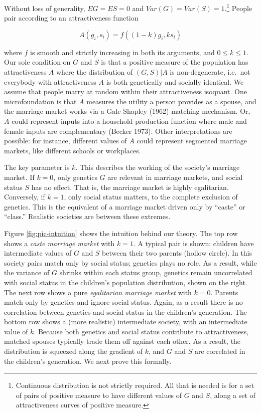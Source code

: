 \documentclass[
]{article}
\begin{document}
Without loss of generality, \(EG = ES = 0\) and \(Var(G) = Var(S) = 1\).\footnote{Continuous distribution is not strictly required. All that is
  needed is for a set of pairs of positive measure to have different
  values of \(G\) and \(S\), along a set of attractiveness curves of
  positive measure.}
People pair according to an attractiveness function

\[
A(g_{i},s_{i}) = f((1-k)g_{i},ks_{i})
\]

where \(f\) is smooth and strictly increasing in both its arguments, and
\(0 \le k \le 1\). Our sole condition on \(G\) and \(S\) is that a positive
measure of the population has attractiveness \(A\) where the distribution
of \((G, S)|A\) is non-degenerate, i.e.~not everybody with attractiveness
\(A\) is both genetically and socially identical. We assume that people
marry at random within their attractiveness isoquant. One
microfoundation is that \(A\) measures the utility a person provides as a
spouse, and the marriage market works via a Gale-Shapley
(1962) matching mechanism. Or, \(A\) could represent inputs
into a household production function where male and female inputs are
complementary (Becker 1973). Other interpretations are possible:
for instance, different values of \(A\) could represent segmented marriage
markets, like different schools or workplaces.

The key parameter is \(k\). This describes the working of the society's
marriage market. If \(k = 0\), only genetics \(G\) are relevant in marriage
markets, and social status \(S\) has no effect. That is, the marriage
market is highly egalitarian. Conversely, if \(k = 1\), only social status
matters, to the complete exclusion of genetics. This is the equivalent
of a marriage market driven only by ``caste'' or ``class.'' Realistic
societies are between these extremes.

Figure \ref{fig:pic-intuition} shows the intuition behind our theory.
The top row shows a \emph{caste marriage market} with \(k = 1\). A typical pair
is shown: children have intermediate values of \(G\) and \(S\) between their
two parents (hollow circle). In this society pairs match only by social
status; genetics plays no role. As a result, while the variance of \(G\)
shrinks within each status group, genetics remain uncorrelated with
social status in the children's population distribution, shown on the
right. The next row shows a pure \emph{egalitarian marriage market} with
\(k = 0\). Parents match only by genetics and ignore social status. Again,
as a result there is no correlation between genetics and social status
in the children's generation. The bottom row shows a (more realistic)
intermediate society, with an intermediate value of \(k\). Because both
genetics and social status contribute to attractiveness, matched spouses
typically trade them off against each other. As a result, the
distribution is squeezed along the gradient of \(k\), and \(G\) and \(S\) are
correlated in the children's generation. We next prove this formally.
\end{document}
